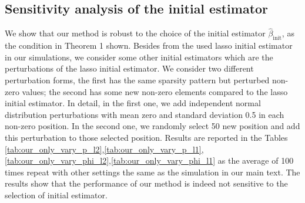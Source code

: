 \documentclass[12pt]{article}
\begin{document}
\subsection{Sensitivity analysis of the initial estimator}
We show that our method is robust to the choice of the initial estimator $\hat{\beta}_{\text{init}}$, as the condition in Theorem 1 shown. Besides from the used lasso initial estimator in our simulations, we consider some other initial estimators which are the perturbations of the lasso initial estimator. We consider two different perturbation forms, the first has the same sparsity pattern but perturbed non-zero values; the second has some new non-zero elements compared to the lasso initial estimator. In detail, in the first one, we add independent normal distribution perturbations with mean zero and standard deviation 0.5 in each non-zero position. In the second one, we randomly select 50 new position and add this perturbation to those selected position. Results are reported in the Tables \ref{tab:our_only_vary_p_l2},\ref{tab:our_only_vary_p_l1},\ref{tab:our_only_vary_phi_l2},\ref{tab:our_only_vary_phi_l1} as the average of 100 times repeat with other settings the same as the simulation in our main text. The results show that the performance of our method is indeed not sensitive to the selection of initial estimator. 
\end{document}
